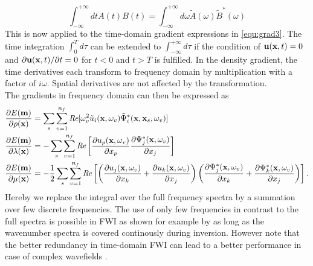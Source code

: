 \begin{equation}
\int_{-\infty}^{+\infty}dtA(t)B(t) =\int_{-\infty}^{+\infty}d\omega \tilde{A}(\omega)\tilde{B}^*(\omega) \label{equ:fourier2}
\end{equation}
This is now applied to the time-domain gradient expressions in \ref{equ:grad3}. The time integration $\int_0^T d\tau$ can be extended to $\int_{-\infty}^{+\infty} d\tau$ if the condition of $\textbf u(\textbf x,t)=0$ and $\partial\textbf u(\textbf x,t)/\partial t=0$ for $t<0$ and $t>T$ is fulfilled. In the density gradient, the time derivatives each transform to frequency domain by multiplication with a factor of $i\omega$. Spatial derivatives are not affected by the transformation.\\
The gradients in frequency domain can then be expressed as 
\begin{equation}
\begin{split}
 \frac{\partial E(\textbf m)}{\partial\rho(\textbf x)} & =\sum_{s}\sum_{v=1}^{n_f}\textit{Re}[\omega_v^2 \tilde{u}_i(\textbf{x},\omega_v)\tilde{\Psi}_i^*(\textbf{x},\textbf x_s,\omega_v)]
\\
\frac{\partial E(\textbf m)}{\partial\lambda(\textbf x)} & =-\sum_{s}\sum_{v=1}^{n_f}\textit{Re}\left [\frac{\partial u_p(\textbf x,\omega_v)}{\partial x_p}\frac{\partial\Psi_j^*(\textbf x,\omega_v)}{\partial x_j}\right ]
\\
 \frac{\partial E(\textbf m)}{\partial\mu(\textbf x)} & =-\frac{1}{2}\sum_{s}\sum_{v=1}^{n_f} \textit{Re}\left [\left (\frac{\partial u_j(\textbf x,\omega_v)}{\partial x_k}+\frac{\partial u_k(\textbf x,\omega_v)}{\partial x_j}\right )\left (\frac{\partial\Psi^*_j(\textbf x,\omega_v)}{\partial x_k}+\frac{\partial\Psi^*_k(\textbf x,\omega_v)}{\partial x_j}\right )\right ].
\end{split}\label{equ:grad5}
\end{equation}
Hereby we replace the integral over the full frequency spectra by a summation over few discrete frequencies. The use of only few frequencies in contrast to the full spectra is possible in FWI as shown for example by \citep[e.g.][]{Sir04,Ple09,Bro11} as long as the wavenumber spectra is covered continously during inversion. However note that the better redundancy in time-domain FWI can lead to a better performance in case of complex wavefields \citep{Vir09}.
